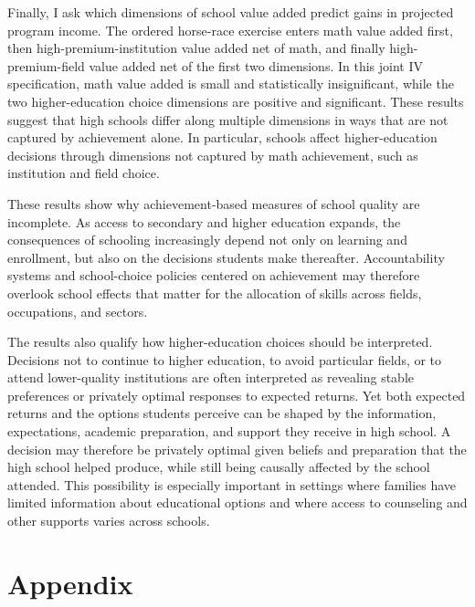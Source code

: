 \documentclass[a4paper, article, english, oneside, unknownkeysallowed, 12pt]{memoir}
\begin{document}
Finally, I ask which dimensions of school value added predict gains in projected program income.
The ordered horse-race exercise enters math value added first, then high-premium-institution value added net of math, and finally high-premium-field value added net of the first two dimensions.
In this joint IV specification, math value added is small and statistically insignificant, while the two higher-education choice dimensions are positive and significant.
These results suggest that high schools differ along multiple dimensions in ways that are not captured by achievement alone.
In particular, schools affect higher-education decisions through dimensions not captured by math achievement, such as institution and field choice.

These results show why achievement-based measures of school quality are incomplete.
As access to secondary and higher education expands, the consequences of schooling increasingly depend not only on learning and enrollment, but also on the decisions students make thereafter.
Accountability systems and school-choice policies centered on achievement may therefore overlook school effects that matter for the allocation of skills across fields, occupations, and sectors.

The results also qualify how higher-education choices should be interpreted.
Decisions not to continue to higher education, to avoid particular fields, or to attend lower-quality institutions are often interpreted as revealing stable preferences or privately optimal responses to expected returns.
Yet both expected returns and the options students perceive can be shaped by the information, expectations, academic preparation, and support they receive in high school.
A decision may therefore be privately optimal given beliefs and preparation that the high school helped produce, while still being causally affected by the school attended.
This possibility is especially important in settings where families have limited information about educational options and where access to counseling and other supports varies across schools.





\clearpage
\printbibliography


\section{Appendix}




\end{document}
